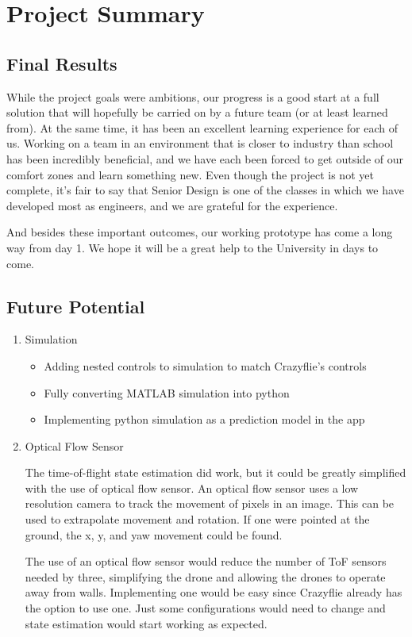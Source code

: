 \documentclass[12pt, titlepage]{article}
\begin{document}
\section{Project Summary}

\subsection{Final Results}
While the project goals were ambitions, our progress is a good start at a full solution that will hopefully be carried on by a future team (or at least learned from). At the same time, it has been an excellent learning experience for each of us. Working on a team in an environment that is closer to industry than school has been incredibly beneficial, and we have each been forced to get outside of our comfort zones and learn something new. Even though the project is not yet complete, it's fair to say that Senior Design is one of the classes in which we have developed most as engineers, and we are grateful for the experience.

And besides these important outcomes, our working prototype has come a long way from day 1. We hope it will be a great help to the University in days to come.

\subsection{Future Potential}
\begin{enumerate}
\item Simulation
\begin{itemize}
\item Adding nested controls to simulation to match Crazyflie's controls
\item Fully converting MATLAB simulation into python
\item Implementing python simulation as a prediction model in the app
\end{itemize}
\item Optical Flow Sensor

  The time-of-flight state estimation did work, but it could be greatly simplified with the use of optical flow sensor. An optical flow sensor uses a low resolution camera to track the movement of pixels in an image. This can be used to extrapolate movement and rotation. If one were pointed at the ground, the x, y, and yaw movement could be found. 

  The use of an optical flow sensor would reduce the number of ToF sensors needed by three, simplifying the drone and allowing the drones to operate away from walls. Implementing one would be easy since Crazyflie already has the option to use one. Just some configurations would need to change and state estimation would start working as expected. 
\end{enumerate}
\end{document}
